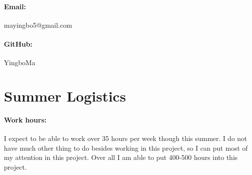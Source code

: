 \documentclass[a4paper,12pt,onecolumn]{article}
\begin{document}
\paragraph{Email:} mayingbo5@gmail.com

\paragraph{GitHub:} YingboMa


\section{Summer Logistics} %
\label{sec:summer_logistics}

\paragraph{Work hours:} I expect to be able to work over 35 hours per week though this summer.
I do not have much other thing to do besides working in this project, so I can put most of my
attention in this project. Over all I am able to put 400-500 hours into this project.




\end{document}
